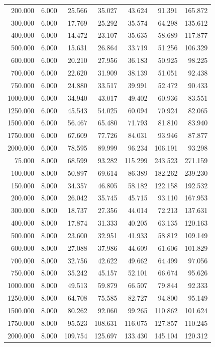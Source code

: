{\begin{longtable}{rrrrrrr}
200.000 & 6.000 & 25.566 & 35.027 & 43.624 & 91.391 & 165.872 \\
300.000 & 6.000 & 17.769 & 25.292 & 35.574 & 64.298 & 135.612 \\
400.000 & 6.000 & 14.472 & 23.107 & 35.635 & 58.689 & 117.877 \\
500.000 & 6.000 & 15.631 & 26.864 & 33.719 & 51.256 & 106.329 \\
600.000 & 6.000 & 20.210 & 27.956 & 36.183 & 50.925 & 98.225 \\
700.000 & 6.000 & 22.620 & 31.909 & 38.139 & 51.051 & 92.438 \\
750.000 & 6.000 & 24.880 & 33.517 & 39.991 & 52.472 & 90.433 \\
1000.000 & 6.000 & 34.940 & 43.017 & 49.402 & 60.936 & 83.551 \\
1250.000 & 6.000 & 45.543 & 54.025 & 60.094 & 70.924 & 82.065 \\
1500.000 & 6.000 & 56.467 & 65.480 & 71.793 & 81.810 & 83.940 \\
1750.000 & 6.000 & 67.609 & 77.726 & 84.031 & 93.946 & 87.877 \\
2000.000 & 6.000 & 78.595 & 89.999 & 96.234 & 106.191 & 93.298 \\
75.000 & 8.000 & 68.599 & 93.282 & 115.299 & 243.523 & 271.159 \\
100.000 & 8.000 & 50.897 & 69.614 & 86.389 & 182.262 & 239.230 \\
150.000 & 8.000 & 34.357 & 46.805 & 58.182 & 122.158 & 192.532 \\
200.000 & 8.000 & 26.042 & 35.745 & 45.715 & 93.110 & 167.953 \\
300.000 & 8.000 & 18.737 & 27.356 & 44.014 & 72.213 & 137.631 \\
400.000 & 8.000 & 17.874 & 31.333 & 40.205 & 63.135 & 120.163 \\
500.000 & 8.000 & 23.600 & 32.951 & 41.933 & 58.812 & 109.149 \\
600.000 & 8.000 & 27.088 & 37.986 & 44.609 & 61.606 & 101.829 \\
700.000 & 8.000 & 32.756 & 42.622 & 49.662 & 64.499 & 97.056 \\
750.000 & 8.000 & 35.242 & 45.157 & 52.101 & 66.674 & 95.626 \\
1000.000 & 8.000 & 49.513 & 59.879 & 66.507 & 79.844 & 92.333 \\
1250.000 & 8.000 & 64.708 & 75.585 & 82.727 & 94.800 & 95.149 \\
1500.000 & 8.000 & 80.262 & 92.060 & 99.265 & 110.862 & 101.624 \\
1750.000 & 8.000 & 95.523 & 108.631 & 116.075 & 127.857 & 110.245 \\
2000.000 & 8.000 & 109.754 & 125.697 & 133.430 & 145.104 & 120.312 \\
\end{longtable}
}